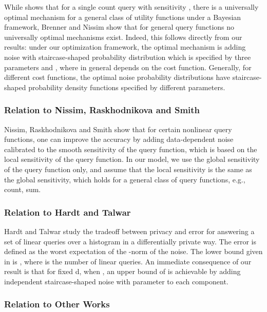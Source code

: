 While \cite{Ghosh09} shows that  for a single count query with sensitivity , there is a universally optimal mechanism for a general class of utility functions  under a Bayesian framework, Brenner and Nissim  \cite{Nissim10}  show that for general query functions no universally optimal mechanisms exist. Indeed, this follows directly from our results:  under our optimization framework, the optimal mechanism is adding noise with staircase-shaped probability distribution which is specified by three parameters  and , where in general  depends on the cost function.  Generally, for different cost functions, the optimal noise probability distributions have staircase-shaped probability density functions specified by different parameters.


\subsubsection{Relation to   Nissim, Raskhodnikova and Smith \cite{NRS07}  }

Nissim, Raskhodnikova and Smith \cite{NRS07} show that for certain nonlinear query functions, one can improve the accuracy by adding data-dependent noise calibrated to the smooth sensitivity of the query function, which is based on the local sensitivity of the query function. In our model, we use   the global sensitivity of the query function only, and assume that the local sensitivity is the same as the global sensitivity, which holds for a general class of query functions, e.g., count, sum.





\subsubsection{Relation to Hardt and Talwar  \cite{geometry}  }


Hardt and Talwar \cite{geometry} study the tradeoff between privacy and error for answering a set of linear queries over a histogram in a differentially private way. The  error is defined as the worst  expectation of the -norm of the noise. The lower bound given in \cite{geometry} is , where  is the number of linear queries. An immediate consequence of our result is that for fixed d, when , an upper bound of  is achievable by adding independent staircase-shaped noise with parameter  to each component.


\subsubsection{Relation to Other Works}

